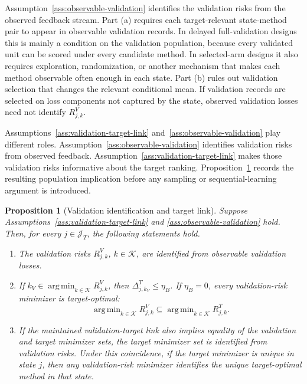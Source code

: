 \documentclass[a4paper, 12pt]{article}
\theoremstyle{plain}
\newtheorem{proposition}{Proposition}
\theoremstyle{remark}
\DeclareMathOperator*{\argmin}{arg\,min}
\newcommand{\Kcal}{\mathcal{K}}
\newcommand{\1}{\mathbf{1}}
\begin{document}
Assumption~\ref{ass:observable-validation} identifies the validation risks from the observed feedback stream. Part (a) requires each target-relevant state-method pair to appear in observable validation records. In delayed full-validation designs this is mainly a condition on the validation population, because every validated unit can be scored under every candidate method. In selected-arm designs it also requires exploration, randomization, or another mechanism that makes each method observable often enough in each state. Part (b) rules out validation selection that changes the relevant conditional mean. If validation records are selected on loss components not captured by the state, observed validation losses need not identify \(R^V_{j,k}\).

Assumptions~\ref{ass:validation-target-link} and~\ref{ass:observable-validation} play different roles. Assumption~\ref{ass:observable-validation} identifies validation risks from observed feedback. Assumption~\ref{ass:validation-target-link} makes those validation risks informative about the target ranking. Proposition~\ref{prop:identification} records the resulting population implication before any sampling or sequential-learning argument is introduced.

\begin{proposition}[Validation identification and target link]
\label{prop:identification}
Suppose Assumptions~\ref{ass:validation-target-link} and \ref{ass:observable-validation} hold. Then, for every \(j\in\mathcal J_T\), the following statements hold.
\begin{enumerate}[label=(\alph*), leftmargin=*]
    \item The validation risks \(R^V_{j,k}\), \(k\in\Kcal\), are identified from observable validation losses.
    \item If \(k_V\in\argmin_{k\in\Kcal}R^V_{j,k}\), then \(\Delta^T_{j,k_V}\leq\eta_B\). If \(\eta_B=0\), every validation-risk minimizer is target-optimal:
    \begin{equation}
    \label{eq:identified-selector}
        \argmin_{k\in\Kcal}R^V_{j,k}
        \subseteq
        \argmin_{k\in\Kcal}R^T_{j,k} .
    \end{equation}
    \item If the maintained validation-target link also implies equality of the validation and target minimizer sets, the target minimizer set is identified from validation risks. Under this coincidence, if the target minimizer is unique in state \(j\), then any validation-risk minimizer identifies the unique target-optimal method in that state.
\end{enumerate}
\end{proposition}
\end{document}
